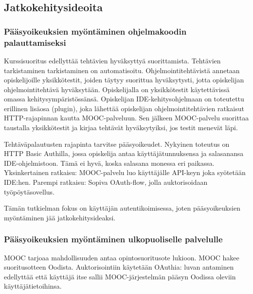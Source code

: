 \documentclass[finnish,gradu]{tktltiki}
\begin{document}



  \subsection{Jatkokehitysideoita} %
  \label{sub:jatkokehitysideoita}

  \subsubsection{Pääsyoikeuksien myöntäminen ohjelmakoodin palauttamiseksi} %
  \label{ssub:pääsyoikeuksien_myöntäminen_ohjelmakoodin_palauttamiseksi}

  Kurssisuoritus edellyttää tehtävien hyväksyttyä suorittamista. Tehtävien tarkistaminen tarkistaminen on automatisoitu. Ohjelmointitehtävistä annetaan opiskelijoille yksikkötestit, joiden täytyy suorittua hyväksytysti, jotta opiskelijan ohjelmointitehtävä hyväksytään. Opiskelijalla on yksikkötestit käytettävissä omassa kehitysympäristössänsä. Opiskelijan IDE-kehitysohjelmaan on toteutettu erillinen lisäosa (plugin), joka lähettää opiskelijan ohjelmointitehtävien ratkaisut HTTP-rajapinnan kautta MOOC-palveluun. Sen jälkeen MOOC-palvelu suorittaa taustalla yksikkötestit ja kirjaa tehtävät hyväksytyiksi, jos testit menevät läpi.

  Tehtäväpalautusten rajapinta tarvitse pääsyoikeudet. Nykyinen toteutus on HTTP Basic Authilla, jossa opiskelija antaa käyttäjätunnuksensa ja salasanansa IDE-ohjelmistoon. Tämä ei hyvä, koska salasana monessa eri paikassa. Yksinkertainen ratkaisu: MOOC-palvelu luo käyttäjälle API-keyn joka syötetään IDE:hen. Parempi ratkaisu: Sopiva OAuth-flow, jolla auktorisoidaan työpöytäsovellus.

  Tämän tutkielman fokus on käyttäjän autentikoimisessa, joten pääsyoikeuksien myöntäminen jää jatkokehitysideaksi.



  \subsubsection{Pääsyoikeuksien myöntäminen ulkopuoliselle palvelulle} %
  \label{ssub:jatkokehitysideoita_auktorisointi}
  MOOC tarjoaa mahdollisuuden antaa opintosuoritusote lukioon. MOOC hakee suoritusotteen Oodista. Auktorisointiin käytetään OAuthia: luvan antaminen edellyttää että käyttäjä itse sallii MOOC-järjestelmän pääsyn Oodissa oleviin käyttäjätietoihinsa.
\end{document}
